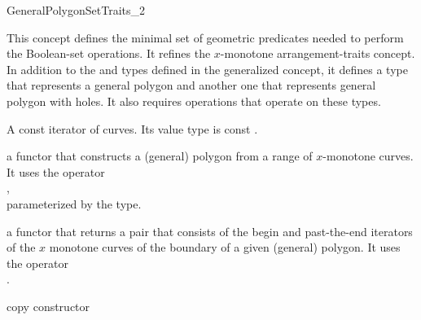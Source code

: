 \ccRefPageBegin

\begin{ccRefConcept}{GeneralPolygonSetTraits_2}

\ccThreeToTwo

\ccDefinition
This concept defines the minimal set of geometric predicates needed to
perform the Boolean-set operations. It refines the $x$-monotone
arrangement-traits concept. In addition to the  and
 types defined in the generalized concept, it defines
a type that represents a general polygon and another one that represents
general polygon with holes. It also requires operations that operate on these
types.

\ccRefines
{}

\ccTypes

\ccGlue
{}

{A const iterator of curves. Its value type is const
.}


\ccThreeToTwo

{a functor that constructs a (general) polygon from a range of
$x$-monotone curves. It uses the operator\\
 , \\
 parameterized by the  type.}

{a functor that returns a pair that consists of the begin and
 past-the-end iterators of the $x$ monotone curves of the boundary of
 a given (general) polygon. It uses the operator\\
 .}

\ccCreation
{}

\ccGlue
{}
{copy constructor}
\ccGlue
{}



\end{ccRefConcept}
